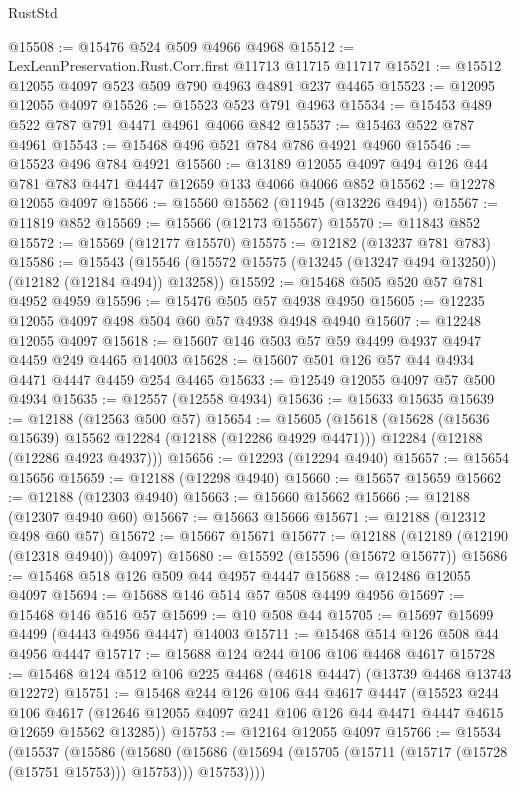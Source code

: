 \begin{lexlean}{RustStd}
\begin{coremodule}
@15508 := @15476 @524 @509 @4966 @4968
@15512 := LexLeanPreservation.Rust.Corr.first @11713 @11715 @11717
@15521 := @15512 @12055 @4097 @523 @509 @790 @4963 @4891 @237 @4465
@15523 := @12095 @12055 @4097
@15526 := @15523 @523 @791 @4963
@15534 := @15453 @489 @522 @787 @791 @4471 @4961 @4066 @842
@15537 := @15463 @522 @787 @4961
@15543 := @15468 @496 @521 @784 @786 @4921 @4960
@15546 := @15523 @496 @784 @4921
@15560 := @13189 @12055 @4097 @494 @126 @44 @781 @783 @4471 @4447 @12659 @133 @4066 @4066 @852
@15562 := @12278 @12055 @4097
@15566 := @15560 @15562 (@11945 (@13226 @494))
@15567 := @11819 @852
@15569 := @15566 (@12173 @15567)
@15570 := @11843 @852
@15572 := @15569 (@12177 @15570)
@15575 := @12182 (@13237 @781 @783)
@15586 := @15543
    (@15546 (@15572 @15575 (@13245 (@13247 @494 @13250)) (@12182 (@12184 @494)) @13258))
@15592 := @15468 @505 @520 @57 @781 @4952 @4959
@15596 := @15476 @505 @57 @4938 @4950
@15605 := @12235 @12055 @4097 @498 @504 @60 @57 @4938 @4948 @4940
@15607 := @12248 @12055 @4097
@15618 := @15607 @146 @503 @57 @59 @4499 @4937 @4947 @4459 @249 @4465 @14003
@15628 := @15607 @501 @126 @57 @44 @4934 @4471 @4447 @4459 @254 @4465
@15633 := @12549 @12055 @4097 @57 @500 @4934
@15635 := @12557 (@12558 @4934)
@15636 := @15633 @15635
@15639 := @12188 (@12563 @500 @57)
@15654 := @15605
    (@15618
      (@15628 (@15636 @15639) @15562 @12284 (@12188 (@12286 @4929 @4471)))
      @12284
      (@12188 (@12286 @4923 @4937)))
@15656 := @12293 (@12294 @4940)
@15657 := @15654 @15656
@15659 := @12188 (@12298 @4940)
@15660 := @15657 @15659
@15662 := @12188 (@12303 @4940)
@15663 := @15660 @15662
@15666 := @12188 (@12307 @4940 @60)
@15667 := @15663 @15666
@15671 := @12188 (@12312 @498 @60 @57)
@15672 := @15667 @15671
@15677 := @12188 (@12189 (@12190 (@12318 @4940)) @4097)
@15680 := @15592 (@15596 (@15672 @15677))
@15686 := @15468 @518 @126 @509 @44 @4957 @4447
@15688 := @12486 @12055 @4097
@15694 := @15688 @146 @514 @57 @508 @4499 @4956
@15697 := @15468 @146 @516 @57
@15699 := @10 @508 @44
@15705 := @15697 @15699 @4499 (@4443 @4956 @4447) @14003
@15711 := @15468 @514 @126 @508 @44 @4956 @4447
@15717 := @15688 @124 @244 @106 @106 @4468 @4617
@15728 := @15468 @124 @512 @106 @225 @4468 (@4618 @4447) (@13739 @4468 @13743 @12272)
@15751 := @15468
    @244
    @126
    @106
    @44
    @4617
    @4447
    (@15523
      @244
      @106
      @4617
      (@12646 @12055 @4097 @241 @106 @126 @44 @4471 @4447 @4615 @12659 @15562 @13285))
@15753 := @12164 @12055 @4097
@15766 := @15534
    (@15537
      (@15586
        (@15680
          (@15686 (@15694 (@15705 (@15711 (@15717 (@15728 (@15751 @15753))) @15753))) @15753))))

\end{coremodule}
\end{lexlean}
